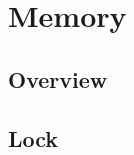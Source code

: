 \part{Memory}


\chapter{Overview}




\chapter{Lock}




\begin{lstlisting}[language=PHP]

\end{lstlisting}




\begin{lstlisting}[language=PHP]

\end{lstlisting}




\begin{lstlisting}[language=PHP]

\end{lstlisting}




\begin{lstlisting}[language=PHP]

\end{lstlisting}




\begin{lstlisting}[language=PHP]

\end{lstlisting}




\begin{lstlisting}[language=PHP]

\end{lstlisting}




\begin{lstlisting}[language=PHP]

\end{lstlisting}




\begin{lstlisting}[language=PHP]

\end{lstlisting}




